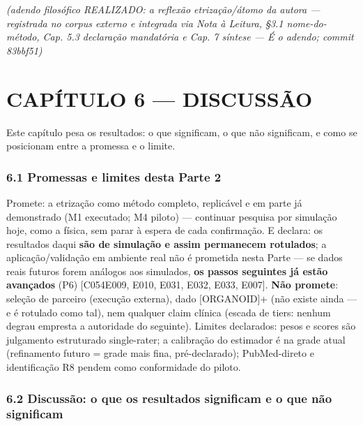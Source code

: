 \documentclass[
  10pt,
]{article}
\begin{document}
\emph{(adendo filosófico REALIZADO: a reflexão etrização/átomo da autora
--- registrada no corpus externo e integrada via Nota à Leitura, §3.1
nome-do-método, Cap. 5.3 declaração mandatória e Cap. 7 síntese --- É o
adendo; commit 83bbf51)}

\hypertarget{capuxedtulo-6-discussuxe3o}{%
\section{CAPÍTULO 6 --- DISCUSSÃO}\label{capuxedtulo-6-discussuxe3o}}

Este capítulo pesa os resultados: o que significam, o que não
significam, e como se posicionam entre a promessa e o limite.

\hypertarget{promessas-e-limites-desta-parte-2}{%
\subsubsection{6.1 Promessas e limites desta Parte
2}\label{promessas-e-limites-desta-parte-2}}

Promete: a etrização como método completo, replicável e em parte já
demonstrado (M1 executado; M4 piloto) --- continuar pesquisa por
simulação hoje, como a física, sem parar à espera de cada confirmação. E
declara: os resultados daqui \textbf{são de simulação e assim permanecem
rotulados}; a aplicação/validação em ambiente real não é prometida nesta
Parte --- se dados reais futuros forem análogos aos simulados,
\textbf{os passos seguintes já estão avançados} (P6)
{[}C054\textbar E009, E010, E031, E032, E033, E007{]}. \textbf{Não
promete}: seleção de parceiro (execução externa), dado {[}ORGANOID{]}+
(não existe ainda --- e é rotulado como tal), nem qualquer claim clínica
(escada de tiers: nenhum degrau empresta a autoridade do seguinte).
Limites declarados: pesos e scores são julgamento estruturado
single-rater; a calibração do estimador é na grade atual (refinamento
futuro = grade mais fina, pré-declarado); PubMed-direto e identificação
R8 pendem como conformidade do piloto.

\hypertarget{discussuxe3o-o-que-os-resultados-significam-e-o-que-nuxe3o-significam}{%
\subsubsection{6.2 Discussão: o que os resultados significam e o que não
significam}\label{discussuxe3o-o-que-os-resultados-significam-e-o-que-nuxe3o-significam}}
\end{document}
